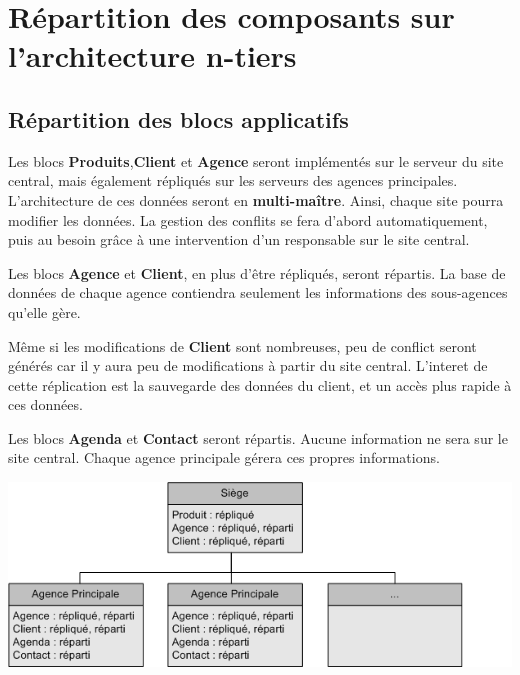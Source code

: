 

\section{Répartition des composants sur l'architecture n-tiers}

\subsection{Répartition des blocs applicatifs}
Les blocs \textbf{Produits},\textbf{Client} et \textbf{Agence} seront implémentés sur le serveur du site central, mais également répliqués sur les serveurs des agences principales. L'architecture de ces données seront en \textbf{multi-maître}. Ainsi, chaque site pourra modifier les données. La gestion des conflits se fera d'abord automatiquement, puis au besoin grâce à une intervention d'un responsable sur le site central.

Les blocs \textbf{Agence} et \textbf{Client}, en plus d'être répliqués, seront répartis. La base de données de chaque agence contiendra seulement les informations des sous-agences qu'elle gère.

Même si les modifications de \textbf{Client} sont nombreuses, peu de conflict seront générés car il y aura peu de modifications à partir du site central. L'interet de cette réplication est la sauvegarde des données du client, et un accès plus rapide à ces données.

Les blocs \textbf{Agenda} et \textbf{Contact} seront répartis. Aucune information ne sera sur le site central. Chaque agence principale gérera ces propres informations.

\begin {center}
\includegraphics[width=\textwidth]{repartition_bloc.png}
\end {center}


